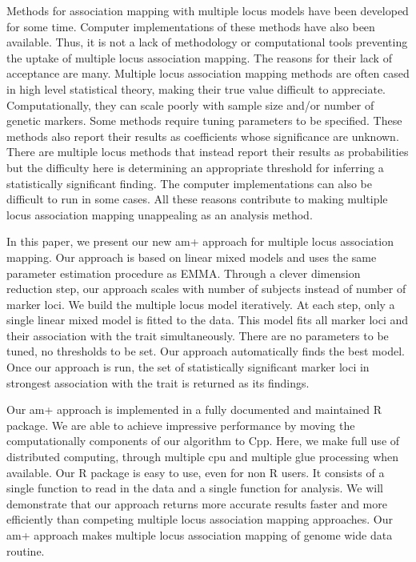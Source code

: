 \documentclass[12pt]{article}
\begin{document}
Methods for association mapping with multiple locus models have been developed 
for some time. Computer implementations of these methods have also been available. 
Thus, it is not a lack of methodology  or computational tools preventing the uptake of 
multiple locus association mapping. The reasons for their lack of acceptance are many. 
Multiple locus association mapping methods are often cased in high level statistical theory, 
making their true value difficult to appreciate.  Computationally, they can scale poorly with 
sample size and/or number of genetic markers. Some methods require tuning parameters 
to be specified. These methods also report their results as coefficients whose significance 
are unknown. There are multiple locus methods that instead report their results as probabilities 
but the difficulty here is determining  an appropriate threshold for inferring a statistically 
significant finding. The computer implementations can also be difficult to run in some cases. 
All these reasons contribute to making multiple locus association mapping unappealing as 
an analysis method.

In this paper, we present our new am+ approach for multiple locus association mapping. 
Our approach is based on linear mixed models and uses the same parameter estimation 
procedure as EMMA. Through a clever dimension reduction step, our approach scales 
with number of subjects instead of number of marker loci. We build the multiple locus 
model iteratively. At each step, only a single linear mixed model is fitted to the data. 
This model fits all marker loci and their association with the trait simultaneously. There 
are no parameters to be tuned, no thresholds to be set. Our approach automatically 
finds the best model. Once our approach is run, the set of statistically significant 
marker loci in strongest association with the trait is returned as its findings.  

Our am+ approach is implemented in a fully documented and maintained R package. 
We are able to achieve impressive performance by moving the computationally 
components of our algorithm to Cpp. Here, we make full use of distributed 
computing, through multiple cpu and multiple glue processing when available. 
Our R package is easy to use, even for non  R users. It consists of a single function
 to read in the data and a single function for analysis. We will demonstrate that 
 our approach returns more accurate results faster and more efficiently than 
 competing multiple locus association mapping approaches. Our am+ approach 
 makes multiple locus association mapping of genome wide data routine.
\end{document}
